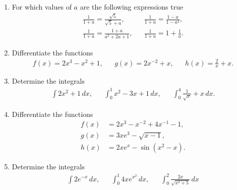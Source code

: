 \begin{enumerate}
	\item For which values of $a$ are the following expressions true
	\begin{align*}
	\frac{1}{1+a}=\frac{\sqrt{5}}{\sqrt{5}+a},&& \frac{1}{1+a}=\frac{1-a}{1-a^2},\\
	\frac{1}{1+a}=\frac{1+a}{a^2+2a+1},&& \frac{1}{1+a}=1+\frac{1}{a}.
	\end{align*}
	
	\item Differentiate the functions
	\begin{align*}
	f(x)=2x^3-x^2+1,&& g(x)=2x^{-2}+x,&& h(x)=\frac{2}{x}+x.
	\end{align*}
	
	\item Determine the integrals
	\begin{align*}
	\int 2x^2+1 \, dx,&& \int_0^1 x^2-3x+1\, dx,&& \int_0^4 \frac{1}{\sqrt{x}}+x \, dx.
	\end{align*}
	
	
	\item Differentiate the functions
	\begin{align*}
	f(x)&=2x^3-x^{-2}+4x^{-1}-1,\\ g(x)&=3xe^3-\sqrt{x-1},\\ h(x)&=2xe^x-\sin(x^2-x).
	\end{align*}
	
	\item Determine the integrals
	\begin{align*}
	\int 2e^{-x} \, dx,&& \int_0^1 4xe^{x^2}\, dx, && \int_0^2 \frac{2x}{\sqrt{x^2+5}}\, dx
	\end{align*}
\end{enumerate}